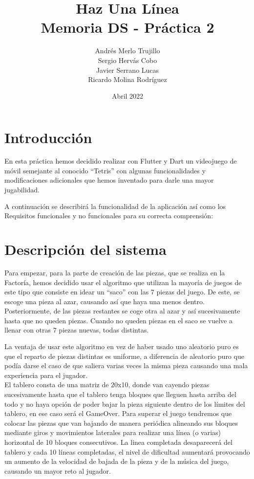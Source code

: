 \documentclass{article}
\title{Haz Una Línea\\
\large Memoria DS - Práctica 2}
\author{Andrés Merlo Trujillo\\ Sergio Hervás Cobo\\ Javier Serrano Lucas\\ Ricardo Molina Rodríguez}
\begin{document}
\date{Abril 2022}
\maketitle
\section{Introducción}
En esta práctica hemos decidido realizar con Flutter y Dart un videojuego de móvil
semejante al conocido ``Tetris'' con algunas funcionalidades y modificaciones adicionales
que hemos inventado para darle una mayor jugabilidad.

A continuación se describirá la funcionalidad de la aplicación así como los Requisitos
funcionales y no funcionales para su correcta comprensión:

\section{Descripción del sistema}
Para empezar, para la parte de creación de las piezas, que se realiza en la Factoría, hemos
 decidido usar el algoritmo que utilizan la mayoría de juegos de este tipo que
 consiste en idear un ``saco'' con las 7 piezas del juego. De este, se escoge una pieza al azar,
 causando así que haya una menos dentro. Posteriormente, de las piezas restantes se coge otra al azar
  y así sucesivamente hasta que no queden piezas. Cuando no queden piezas en el saco se vuelve
  a llenar con otras 7 piezas nuevas, todas distintas.

La ventaja de usar este algoritmo en vez de haber usado uno aleatorio puro es
 que el reparto de piezas distintas es uniforme, a diferencia de aleatorio puro
 que podía darse el caso de que saliera varias veces la misma pieza causando una
 mala experiencia para el jugador.\\


El tablero consta de una matriz de 20x10, donde van cayendo piezas sucesivamente
hasta que el tablero tenga bloques que lleguen hasta arriba del todo y no haya
opción de poder bajar la pieza siguiente dentro de los límites del tablero, en
ese caso será el GameOver. Para superar el juego tendremos que colocar
las piezas que van bajando de manera periódica alineando sus bloques mediante
giros y movimientos laterales para realizar una línea (o varias) horizontal de
10 bloques consecutivos. La linea completada desaparecerá del tablero y cada 10 líneas
completadas, el nivel de dificultad aumentará provocando un aumento de la velocidad de
bajada de la pieza y de la música del juego, causando un mayor reto al jugador.\\
\end{document}
